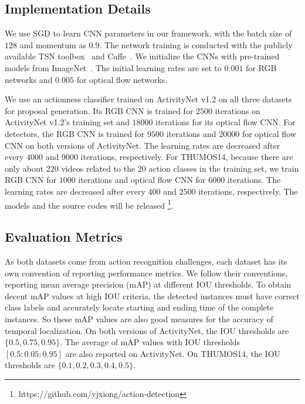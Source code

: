 \documentclass[10pt,twocolumn,letterpaper]{article}
\begin{document}
\subsection{Implementation Details}

We use SGD to learn CNN parameters in our framework, with the batch size of $ 128 $ and momentum as $ 0.9 $.
The network training is conducted with the publicly available TSN toolbox~\cite{Wang2016TSN} and Caffe~\cite{Jia2014Caffe}.
We initialize the CNNs with pre-trained models from ImageNet~\cite{Deng2009ImageNet}.
The initial learning rates are set to $ 0.001 $ for RGB networks and $ 0.005 $ for optical flow networks.

We use an actionness classifier trained on ActivityNet v1.2 on all three datasets for proposal generation. Its RGB CNN is trained for $ 2500 $ iterations on ActivityNet v1.2's training set and $ 18000 $ iterations for its optical flow CNN.
For detectors, the RGB CNN is trained for $9500 $ iterations and $ 20000 $ for optical flow CNN on both versions of ActivityNet.
The learning rates are decreased after every $ 4000 $ and $ 9000 $ iterations, respectively.
For THUMOS14, because there are only about $ 220 $ videos related to the $ 20 $ action classes in the training set, 
we train RGB CNN for $ 1000 $ iterations and optical flow CNN for $ 6000 $ iterations. 
The learning rates are decreased after every $ 400 $ and $ 2500 $ iterations, respectively.
The models and the source codes will be released
\footnote{https://github.com/yjxiong/action-detection}.


\subsection{Evaluation Metrics}\label{sec:exp/metrics}

As both datasets come from action recognition challenges, 
each dataset has its own convention of reporting performance metrics.
We follow their conventions, reporting mean average precision (mAP) at different IOU thresholds.
To obtain decent mAP values at high IOU criteria, the detected instances must have correct class labels and accurately locate starting and ending time of the complete instances. 
So these mAP values are also good measures for the accuracy of temporal localization.
On both versions of ActivityNet, the IOU thresholds are $ \{0.5, 0.75, 0.95\} $. 
The average of mAP values with IOU thresholds $ [0.5:0.05:0.95] $ are also reported on ActivityNet.
On THUMOS14, the IOU thresholds are $ \{0.1, 0.2, 0.3, 0.4, 0.5\} $.
\end{document}
